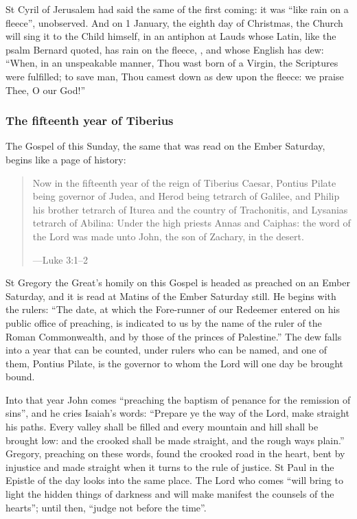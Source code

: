 St Cyril of Jerusalem had said the same of the first coming: it was ``like rain
on a fleece'', unobserved. And on 1 January, the eighth day of Christmas, the
Church will sing it to the Child himself, in an antiphon at Lauds whose Latin,
like the psalm Bernard quoted, has rain on the fleece, , and
whose English has dew: ``When, in an unspeakable manner, Thou wast born of a
Virgin, the Scriptures were fulfilled; to save man, Thou camest down as dew upon
the fleece: we praise Thee, O our God!''

\subsubsection*{The fifteenth year of Tiberius}

The Gospel of this Sunday, the same that was read on the Ember Saturday, begins
like a page of history:

\begin{quote}
Now in the fifteenth year of the reign of Tiberius Caesar, Pontius Pilate being
governor of Judea, and Herod being tetrarch of Galilee, and Philip his brother
tetrarch of Iturea and the country of Trachonitis, and Lysanias tetrarch of
Abilina: Under the high priests Annas and Caiphas: the word of the Lord was
made unto John, the son of Zachary, in the desert.\par
{\smallskip\noindent\small ---Luke 3:1--2\par}
\end{quote}

St Gregory the Great's homily on this Gospel is headed as preached on an
Ember Saturday, and it is read at Matins of the Ember Saturday still. He begins with the
rulers: ``The date, at which the Fore-runner of our Redeemer entered on
his public office of preaching, is indicated to us by the name of the ruler of
the Roman Commonwealth, and by those of the princes of Palestine.'' The dew
falls into a year that can be counted, under rulers who can be named, and one
of them, Pontius Pilate, is the governor to whom the Lord will one day be brought
bound.

Into that year John comes ``preaching the baptism of penance for the remission
of sins'', and he cries Isaiah's words: ``Prepare ye the way of the Lord, make
straight his paths. Every valley shall be filled and every mountain and hill
shall be brought low: and the crooked shall be made straight, and the rough
ways plain.'' Gregory, preaching on these words, found the crooked road in the heart, bent
by injustice and made straight when it turns to the rule of justice. St
Paul in the Epistle of the day looks into the same place. The Lord who comes
``will bring to light the hidden things of darkness and will make manifest the
counsels of the hearts''; until then, ``judge not before the time''.

